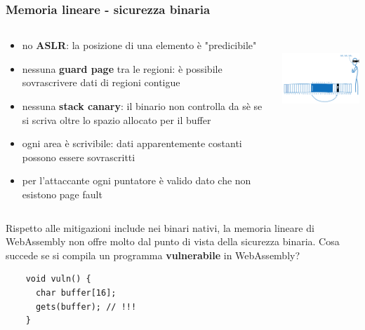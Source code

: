 \documentclass{beamer}
\begin{document}
\begin{frame}
  \frametitle{Memoria lineare - sicurezza binaria}
  \begin{columns}
    \begin{column}{0.6\textwidth}
      \begin{itemize}
        \item no \textbf{ASLR}: la posizione di una elemento è "predicibile"
        \item nessuna \textbf{guard page} tra le regioni: è possibile
          sovrascrivere dati di regioni contigue
        \item nessuna \textbf{stack canary}: il binario non controlla da sè se si scriva
          oltre lo spazio
          allocato per il buffer
        \item ogni area è scrivibile: dati apparentemente costanti possono essere
          sovrascritti
        \item per l'attaccante ogni puntatore è valido dato che non esistono page fault
      \end{itemize}
    \end{column}
    \begin{column}{0.4\textwidth}
      \centerline{\includegraphics[width=5cm,height=3cm,keepaspectratio]{images/attack.png}}
    \end{column}
  \end{columns}
\end{frame}

\begin{frame}[fragile]
  Rispetto alle mitigazioni include nei binari nativi, la memoria lineare di
  WebAssembly non offre molto dal punto di vista della sicurezza binaria.
\newline\newline
  Cosa succede se si compila un programma \textbf{vulnerabile} in WebAssembly?
\newline\newline
  \begin{verbatim}
    void vuln() {
      char buffer[16];
      gets(buffer); // !!!
    }
  \end{verbatim}
\end{frame}
\end{document}
